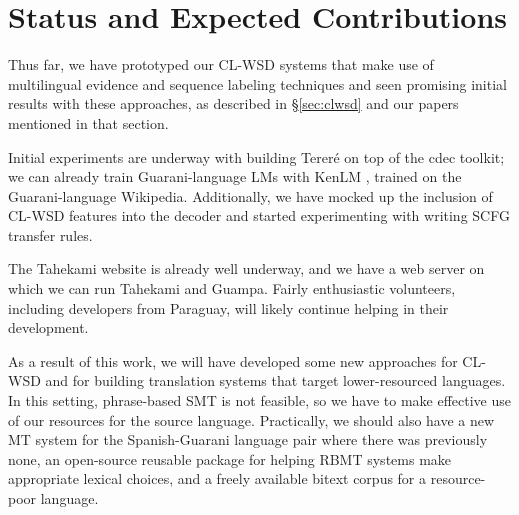\chapter{Status and Expected Contributions}

Thus far, we have prototyped our CL-WSD systems that make use of multilingual
evidence and sequence labeling techniques and seen promising initial results
with these approaches, as described in \S\ref{sec:clwsd} and our papers
mentioned in that section.

Initial experiments are underway with building Tereré on top of the cdec
toolkit; we can already train Guarani-language LMs with KenLM
\cite{Heafield-estimate}, trained on the Guarani-language Wikipedia.
Additionally, we have mocked up the inclusion of CL-WSD features into the
decoder and started experimenting with writing SCFG transfer rules.

The Tahekami website is already well underway, and we have a web server on
which we can run Tahekami and Guampa. Fairly enthusiastic volunteers, including
developers from Paraguay, will likely continue helping in their development.

As a result of this work, we will have developed some new approaches for
CL-WSD and for building translation systems that target lower-resourced
languages. In this setting, phrase-based SMT is not feasible, so we have to
make effective use of our resources for the source language.
Practically, we should also have a new MT system for the Spanish-Guarani
language pair where there was previously none, an open-source reusable
package for helping RBMT systems make appropriate lexical choices, and a freely
available bitext corpus for a resource-poor language.
